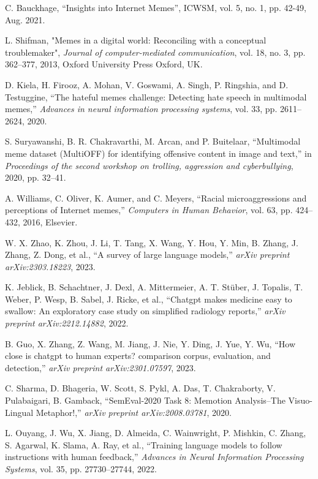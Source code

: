 \documentclass[conference]{IEEEtran}
\begin{document}
\begin{thebibliography}{00}
C. Bauckhage, “Insights into Internet Memes”, ICWSM, vol. 5, no. 1, pp. 42-49, Aug. 2021.

L. Shifman, "Memes in a digital world: Reconciling with a conceptual troublemaker", \emph{Journal of computer-mediated communication}, vol. 18, no. 3, pp. 362--377, 2013, Oxford University Press Oxford, UK.

D. Kiela, H. Firooz, A. Mohan, V. Goswami, A. Singh, P. Ringshia, and D. Testuggine, ``The hateful memes challenge: Detecting hate speech in multimodal memes,'' \emph{Advances in neural information processing systems}, vol. 33, pp. 2611--2624, 2020.


S. Suryawanshi, B. R. Chakravarthi, M. Arcan, and P. Buitelaar, ``Multimodal meme dataset (MultiOFF) for identifying offensive content in image and text,'' in \emph{Proceedings of the second workshop on trolling, aggression and cyberbullying}, 2020, pp. 32--41.

A. Williams, C. Oliver, K. Aumer, and C. Meyers, ``Racial microaggressions and perceptions of Internet memes,'' \emph{Computers in Human Behavior}, vol. 63, pp. 424--432, 2016, Elsevier.

W. X. Zhao, K. Zhou, J. Li, T. Tang, X. Wang, Y. Hou, Y. Min, B. Zhang, J. Zhang, Z. Dong, et al., ``A survey of large language models,'' \emph{arXiv preprint arXiv:2303.18223}, 2023.

K. Jeblick, B. Schachtner, J. Dexl, A. Mittermeier, A. T. St{\"u}ber, J. Topalis, T. Weber, P. Wesp, B. Sabel, J. Ricke, et al., ``Chatgpt makes medicine easy to swallow: An exploratory case study on simplified radiology reports,'' \emph{arXiv preprint arXiv:2212.14882}, 2022.


B. Guo, X. Zhang, Z. Wang, M. Jiang, J. Nie, Y. Ding, J. Yue, Y. Wu, ``How close is chatgpt to human experts? comparison corpus, evaluation, and detection,'' \emph{arXiv preprint arXiv:2301.07597}, 2023.

C. Sharma, D. Bhageria, W. Scott, S. Pykl, A. Das, T. Chakraborty, V. Pulabaigari, B. Gamback, ``SemEval-2020 Task 8: Memotion Analysis--The Visuo-Lingual Metaphor!,'' \emph{arXiv preprint arXiv:2008.03781}, 2020.

L. Ouyang, J. Wu, X. Jiang, D. Almeida, C. Wainwright, P. Mishkin, C. Zhang, S. Agarwal, K. Slama, A. Ray, et al., ``Training language models to follow instructions with human feedback,'' \emph{Advances in Neural Information Processing Systems}, vol. 35, pp. 27730--27744, 2022.


\end{thebibliography}
\end{document}
